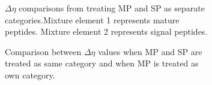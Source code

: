 \documentclass[11pt]{labbook}
\begin{document}
\begin{figure}
\begin{center}
\begin{subfigure}{0.6\textwidth}
\caption{$\Delta\eta$ comparisons from treating MP and SP as separate categories.Mixture element 1 represents mature peptides. Mixture element 2 represents signal peptides.}
\end{subfigure}%
\end{center}
\begin{subfigure}{0.52\textwidth}
\caption{Comparison between $\Delta\eta$ values when MP and SP are treated as same category and when MP is treated as own category.}
\end{subfigure}%
\begin{subfigure}{0.52\textwidth}

\end{subfigure}
\end{figure}
\end{document}
